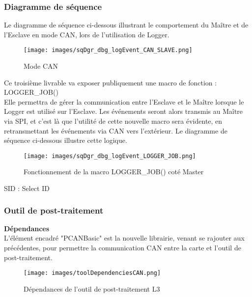 \documentclass[a4paper, 12pt]{report}
\begin{document}
       
    
    \subsubsection{Diagramme de séquence}
Le diagramme de séquence ci-dessous illustrant le comportement du Maître et de l'Esclave en mode CAN, lors de l'utilisation de Logger. 

    \begin{figure}[H]
            \centering
            \texttt{[image: images/sqDgr\_dbg\_logEvent\_CAN\_SLAVE.png]}
            \caption{Mode CAN}
            \label{fig:masterSML3}
    \end{figure}



       
    Ce troisième livrable va exposer publiquement une macro de fonction :\\
    {\color{green}LOGGER\_JOB}()
    \\
    Elle permettra de gérer la communication entre l'Esclave et le Maître lorsque le Logger est utilisé sur l'Esclave. Les événements seront alors transmis au Maître via SPI, et c'est là que l'utilité de cette nouvelle macro sera évidente, en retransmettant les événements via CAN vers l'extérieur. Le diagramme de séquence ci-dessous illustre cette logique.
    \begin{figure}[H]
    \centering
   \texttt{[image: images/sqDgr\_dbg\_logEvent\_LOGGER\_JOB.png]}
        \caption{Fonctionnement de la macro LOGGER\_JOB() coté Master}
        \label{fig:masterSML3}
    \end{figure}
    SID : Select ID
            



\subsubsection{Outil de post-traitement}
\textbf{Dépendances}\\
L'élément encadré "PCANBasic" est la nouvelle librairie, venant se rajouter aux précédentes, pour permettre la communication CAN entre la carte et l'outil de post-traitement. 

     \begin{figure}[H]
        \centering
        \texttt{[image: images/toolDependenciesCAN.png]}
            \caption{Dépendances de l'outil de post-traitement L3}
            \label{fig:diagExempleL1}
    \end{figure}
\end{document}
